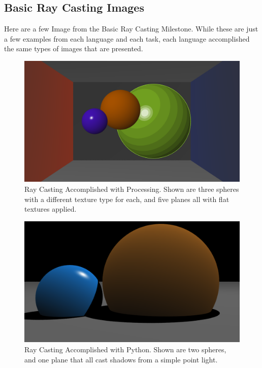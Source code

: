 \subsection{Basic Ray Casting Images}
Here are a few Image from the Basic Ray Casting Milestone.  While these are just a few examples from each language and each task, each language accomplished the same types of images that are presented.
\begin{figure}[ht]
\centering
\includegraphics[width=\textwidth]{figures/BasicRayCastingProcessing.png}
\caption{Ray Casting Accomplished with Processing. Shown are three spheres with a different texture type for each, and five planes all with flat textures applied.}
\label{fig:processingraycasting}
\end{figure}

\begin{figure}[ht]
\centering
\includegraphics[width=\textwidth]{figures/ShadowCastingPython.png}
\caption{Ray Casting Accomplished with Python.  Shown are two spheres, and one plane that all cast shadows from a simple point light. }
\label{fig:pythonraycasting}
\end{figure}

